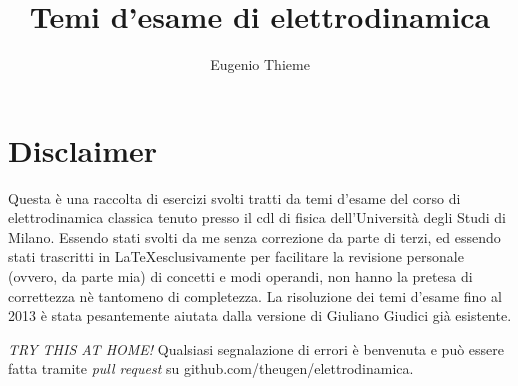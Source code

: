 \documentclass[a4paper,11pt]{book}
\begin{document}
\author{Eugenio Thieme}
\title{Temi d'esame di elettrodinamica}
\maketitle
\tableofcontents
\chapter*{Disclaimer}
Questa è una raccolta di esercizi svolti tratti da temi d'esame del corso
di elettrodinamica classica tenuto presso il cdl di fisica dell'Università
degli Studi di Milano.
Essendo stati svolti da me senza correzione da parte di terzi, ed essendo
stati trascritti in \LaTeX esclusivamente per facilitare la revisione personale (ovvero, da parte mia) di
concetti e modi operandi, non hanno la pretesa di correttezza nè tantomeno
di completezza. 
La risoluzione dei temi d'esame fino al 2013 è stata pesantemente aiutata dalla
versione di Giuliano Giudici già esistente.

\emph{TRY THIS AT HOME!}
Qualsiasi segnalazione di errori è benvenuta e può essere fatta tramite 
\emph{pull request} su github.com/theugen/elettrodinamica.




\end{document}
